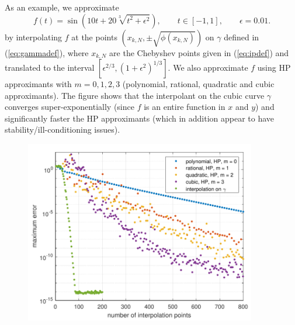 \documentclass[12pt,a4paper]{article}
\begin{document}
As an example, we approximate 
\begin{equation*}
f(t) = \sin(10t + 20\sqrt[3]{t^2 + \epsilon^2}), \qquad t \in [-1, 1], \qquad \epsilon = 0.01.
\end{equation*}
by interpolating $f$ at the points $(x_{k,N}, \pm \sqrt{\phi(x_{k,N})})$ on $\gamma$ defined in (\ref{eq:gammadef}), where $x_{k,N}$ are the Chebyshev points given in (\ref{eq:ipdef}) and translated to the interval $[\epsilon^{2/3}, (1 + \epsilon^2)^{1/3}]$. We also approximate $f$ using HP approximants with $m=0, 1, 2, 3$ (polynomial, rational, quadratic and cubic approximants). The figure shows that the interpolant on the cubic curve $\gamma$ converges super-exponentially (since $f$ is an entire function in $x$ and $y$) and significantly faster the HP approximants (which in addition appear to have stability/ill-conditioning issues).

\begin{figure}[h!]
	\centering
	\includegraphics[width = 0.9\textwidth]{cubic_sing_ex.pdf}
\end{figure}
\end{document}
